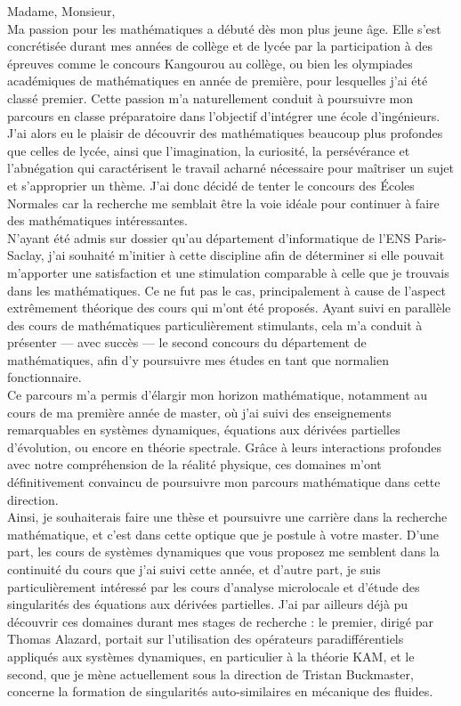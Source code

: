 \documentclass[12pt,a4paper]{article}
\begin{document}
Madame, Monsieur, \\

Ma passion pour les mathématiques a débuté dès mon plus jeune âge. Elle s’est concrétisée durant mes années de collège et de lycée par la participation à des épreuves comme le concours Kangourou au collège, ou bien les olympiades académiques de mathématiques en année de première, pour lesquelles j’ai été classé premier.  Cette passion m’a naturellement conduit à poursuivre mon parcours en classe préparatoire dans l’objectif d’intégrer une école d’ingénieurs.  \\

J'ai alors eu le plaisir de découvrir des mathématiques beaucoup plus profondes que celles de lycée, ainsi que l’imagination, la curiosité, la persévérance et l’abnégation qui caractérisent le travail acharné nécessaire pour maîtriser un sujet et s'approprier un thème. J'ai donc décidé de tenter le concours des Écoles Normales car la recherche me semblait être la voie idéale pour continuer à faire des mathématiques intéressantes. \\

N’ayant été admis sur dossier qu’au département d’informatique de l’ENS Paris-Saclay, j’ai souhaité m'initier à cette discipline afin de déterminer si elle pouvait m’apporter une satisfaction et une stimulation comparable à celle que je trouvais dans les mathématiques. Ce ne fut pas le cas, principalement à cause de l'aspect extrêmement théorique des cours qui m'ont été proposés. Ayant suivi en parallèle des cours de mathématiques particulièrement stimulants, cela m’a conduit à présenter — avec succès — le second concours du département de mathématiques, afin d’y poursuivre mes études en tant que normalien fonctionnaire.\\

Ce parcours m’a permis d’élargir mon horizon mathématique, notamment au cours de ma première année de master, où j’ai suivi des enseignements remarquables en systèmes dynamiques, équations aux dérivées partielles d’évolution, ou encore en théorie spectrale. Grâce à leurs interactions profondes avec notre compréhension de la réalité physique, ces domaines m’ont définitivement convaincu de poursuivre mon parcours mathématique dans cette direction.\\

Ainsi, je souhaiterais faire une thèse et poursuivre une carrière dans la recherche mathématique, et c'est dans cette optique que je postule à votre master. D'une part, les cours de systèmes dynamiques que vous proposez me semblent dans la continuité du cours que j'ai suivi cette année, et d'autre part, je suis particulièrement intéressé par les cours d'analyse microlocale et d'étude des singularités des équations aux dérivées partielles. J'ai par ailleurs déjà pu découvrir ces domaines durant mes stages de recherche : le premier, dirigé par Thomas Alazard, portait sur l'utilisation des opérateurs paradifférentiels appliqués aux systèmes dynamiques, en particulier à la théorie KAM, et le second, que je mène actuellement sous la direction de Tristan Buckmaster, concerne la formation de singularités auto-similaires en mécanique des fluides. \\
\end{document}
